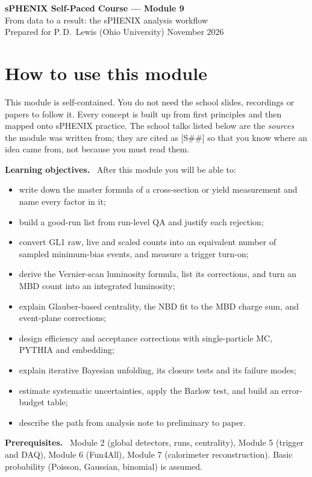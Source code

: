 \documentclass[11pt,letterpaper]{article}
\newcommand{\hd}[1]{\par\smallskip\noindent\textbf{\color{blue!50!black}#1.}\ }
\begin{document}
\begin{center}{\LARGE\bfseries sPHENIX Self-Paced Course --- Module 9}\\[4pt]
{\Large From data to a result: the sPHENIX analysis workflow}\\[8pt]
Prepared for P.\,D.\ Lewis (Ohio University) \quad November 2026\end{center}

\tableofcontents
\newpage

\section*{How to use this module}
This module is self-contained. You do not need the school slides, recordings or papers to follow it. Every concept is built up
from first principles and then mapped onto sPHENIX practice. The school talks listed below are the \emph{sources} the module was
written from; they are cited as [S\#\#] so that you know where an idea came from, not because you must read them.

\hd{Learning objectives} After this module you will be able to:
\begin{itemize}
\item write down the master formula of a cross-section or yield measurement and name every factor in it;
\item build a good-run list from run-level QA and justify each rejection;
\item convert GL1 raw, live and scaled counts into an equivalent number of sampled minimum-bias events, and measure a trigger turn-on;
\item derive the Vernier-scan luminosity formula, list its corrections, and turn an MBD count into an integrated luminosity;
\item explain Glauber-based centrality, the NBD fit to the MBD charge sum, and event-plane corrections;
\item design efficiency and acceptance corrections with single-particle MC, PYTHIA and embedding;
\item explain iterative Bayesian unfolding, its closure tests and its failure modes;
\item estimate systematic uncertainties, apply the Barlow test, and build an error-budget table;
\item describe the path from analysis note to preliminary to paper.
\end{itemize}
\hd{Prerequisites} Module 2 (global detectors, runs, centrality), Module 5 (trigger and DAQ), Module 6 (Fun4All), Module 7
(calorimeter reconstruction). Basic probability (Poisson, Gaussian, binomial) is assumed.
\end{document}
